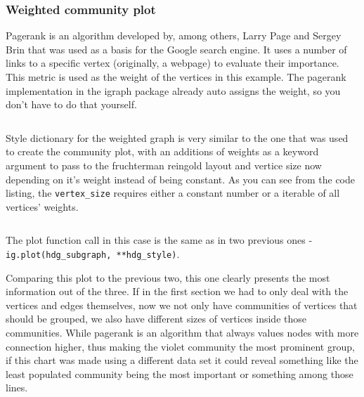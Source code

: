 \documentclass[12pt, a4paper]{article}
\begin{document}
\subsubsection{Weighted community plot}

Pagerank\cite{pagerank} is an algorithm developed by, among others, Larry Page and Sergey Brin that was used as a basis for the Google search engine. It uses a number of links to a specific vertex (originally, a webpage) to evaluate their importance. This metric is used as the weight of the vertices in this example. The pagerank implementation in the igraph package already auto assigns the weight, so you don't have to do that yourself.


\bgroup
  \inputminted[linenos, breaklines=true, fontsize=\scriptsize]{python}{src/youtube/hdg_weighted/1_pagerank.py}
  \label{listing:iplot_1pg}
\egroup


Style dictionary for the weighted graph is very similar to the one that was used to create the community plot, with an additions of weights as a keyword argument to pass to the fruchterman reingold layout and vertice size now depending on it's weight instead of being constant. As you can see from the code listing, the \texttt{vertex\_size} requires either a constant number or a iterable of all vertices' weights.

\bgroup
  \inputminted[linenos, breaklines=true, fontsize=\scriptsize, firstnumber=last]{python}{src/youtube/hdg_weighted/2_style_dict.py}
  \label{listing:iplot_32sd}
\egroup

%

The plot function call in this case is the same as in two previous ones - \texttt{ig.plot(hdg\_subgraph, **hdg\_style)}.

Comparing this plot to the previous two, this one clearly presents the most information out of the three. If in the first section we had to only deal with the vertices and edges themselves, now we not only have communities of vertices that should be grouped, we also have different sizes of vertices inside those communities. While pagerank is an algorithm that always values nodes with more connection higher, thus making the violet community the most prominent group, if this chart was made using a different data set it could reveal something like the least populated community being the most important or something among those lines.
\end{document}
